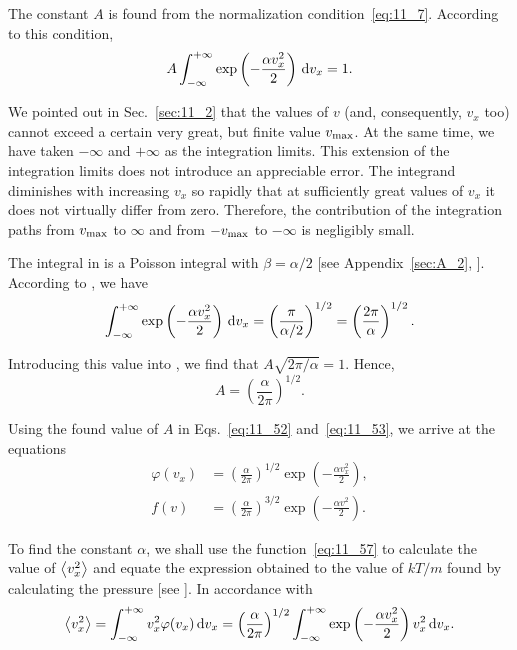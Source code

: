 The constant $A$ is found from the normalization condition~\eqref{eq:11_7}. According to this condition,
\begin{equation}\label{eq:11_54}
	A \int_{-\infty}^{+\infty}  \exp\left(-\frac{\alpha v_x^2}{2}\right)\,\mathrm{d} v_x = 1.
\end{equation}

\noindent
We pointed out in Sec.~\ref{sec:11_2} that the values of $v$ (and, consequently, $v_x$ too) cannot exceed a certain very great, but finite value $v_{\text{max}}$. At the same time, we have taken $-\infty$ and $+\infty$ as the integration limits. This extension of the integration limits does not introduce an appreciable error. The integrand diminishes with increasing $v_x$ so rapidly that at sufficiently great values of $v_x$ it does not virtually differ from zero. Therefore, the contribution of the integration paths from $v_{\text{max}}$ to $\infty$ and from $-v_{\text{max}}$ to $-\infty$ is negligibly small.

The integral in  is a Poisson integral with $\beta=\alpha/2$ [see Appendix~\ref{sec:A_2}, ]. According to , we have
\begin{equation}\label{eq:11_55}
	\int_{-\infty}^{+\infty}  \exp\left(-\frac{\alpha v_x^2}{2}\right)\,\mathrm{d} v_x = \left(\frac{\pi}{\alpha/2}\right)^{1/2} = \left(\frac{2\pi}{\alpha}\right)^{1/2}.
\end{equation}

\noindent
Introducing this value into , we find that $A\sqrt{2\pi/\alpha}=1$. Hence,
\begin{equation}\label{eq:11_56}
	A = \left(\frac{\alpha}{2\pi}\right)^{1/2}.
\end{equation}

Using the found value of $A$ in Eqs.~\eqref{eq:11_52} and~\eqref{eq:11_53}, we arrive at the equations
\begin{align}
	\varphi(v_x) &= \left(\frac{\alpha}{2\pi}\right)^{1/2} \exp\left(-\frac{\alpha v_x^2}{2}\right),\label{eq:11_57}\\
	f(v) &= \left(\frac{\alpha}{2\pi}\right)^{3/2} \exp\left(-\frac{\alpha v^2}{2}\right).\label{eq:11_58}
\end{align}

To find the constant $\alpha$, we shall use the function~\eqref{eq:11_57} to calculate the value of $\left\langle v_x^2 \right\rangle$ and equate the expression obtained to the value of $kT/m$ found by calculating the pressure [see ]. In accordance with 
\begin{equation}\label{eq:11_59}
	\left\langle v_x^2 \right\rangle = \int_{-\infty}^{+\infty} v_x^2\varphi(v_x)\,\mathrm{d} v_x = \left(\frac{\alpha}{2\pi}\right)^{1/2} \int_{-\infty}^{+\infty} \exp\left(-\frac{\alpha v_x^2}{2}\right) v_x^2\,\mathrm{d} v_x.
\end{equation}

